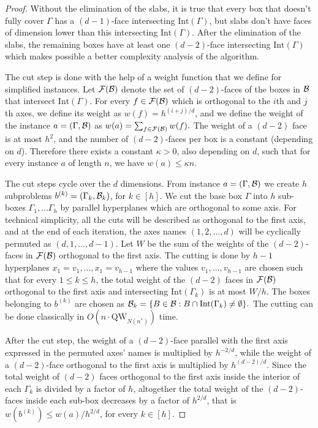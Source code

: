 \documentclass[12pt]{article}
\newcommand{\qw}{\mathrm{QW}}
\newcommand{\Int}[1]{\mathrm{Int}(#1)}
\theoremstyle{definition}
\begin{document}
\begin{proof}
Without the elimination of the slabs, it is true that every box that doesn't fully cover $\Gamma$ has a $(d-1)$-face intersecting $\Int{\Gamma}$, but slabs don't have faces of dimension lower than this intersecting $\Int{\Gamma}$. 
After the elimination of the slabs, the remaining boxes have at least one $(d-2)$-face intersecting $\Int{\Gamma}$ which makes possible a better complexity analysis of the algorithm.

The cut step is done with the help of a weight function that we define for simplified instances.
Let ${\cal F(B)}$ denote the set of $(d-2)$-faces of the boxes in ${\cal B}$ that intersect $\Int{\Gamma}$.
For every $f \in {\cal F(B)}$ which is orthogonal to the $i$th and $j$th axes, we define its weight as $w(f) = h^{(i+j)/d}$, and we define the weight of the instance  $a = (\Gamma, {\cal B})$ as $w(a) =  \sum_{f \in {\cal F(B)}} w(f).$ 
The weight of a $(d-2)$ face is at most $h^2$, and the number of $(d-2)$-faces per box is a constant (depending on $d$). Therefore there exists a constant $\kappa >0$, also depending on $d$, such that for every instance $a$ of length $n$, we have $w(a) \leq \kappa n$.


The cut steps cycle over the $d$ dimensions.
From instance $a = (\Gamma, {\cal B})$ we create $h$ subproblems $b^{(k)} = (\Gamma_k , {\cal B}_k)$, for $k \in [h].$
We cut the base box $\Gamma$ into $h$ sub-boxes $\Gamma_1, \ldots  \Gamma_h$ by parallel hyperplanes which are orthogonal to some axis. 
For technical simplicity, all the cuts will be described as orthogonal to the first axis, and at the end of each iteration, the axes names $(1,2, \ldots, d)$ will be cyclically permuted as $(d, 1, \ldots , d-1)$.  Let $W$ be the sum of the weights of the $(d-2)$-faces in ${\cal F(B)}$ orthogonal to the first axis.
The cutting is done by $h-1$ hyperplanes $x_1 = v_1, \ldots , x_1 = v_{h-1}$ where the values $v_1, \ldots , v_{h-1}$ are chosen such that for every $1 \leq k \leq h$,  the total weight of the $(d-2)$ faces in ${\cal F(B)}$ orthogonal to the first axis and intersecting  $\Int{\Gamma_{k}}$ is at most $W/h$. 
The boxes belonging to $b^{(k)}$ are chosen as ${\cal B}_k = \{ B \in {\cal B} : B \cap \Int{\Gamma_{k}} \neq \emptyset \}.$ 
The cutting can be done classically in $O(n \cdot \qw_{N(n^*)})$ time.

After the cut step, the weight of a $(d-2)$-face parallel with the first axis expressed in the permuted axes' names
is multiplied by $h^{-2/d}$, while the weight of a $(d-2)$-face orthogonal to the first axis is multiplied by $h^{(d-2)/d}$.
Since the total weight of $(d-2)$ faces orthogonal to the first axis inside the interior of each $\Gamma_k$ is divided by a factor of $h$, altogether the total weight of the $(d-2)$-faces inside each sub-box decreases by a factor of $h^{2/d}$, that is $w(b^{(k)}) \leq w(a)/h^{2/d}$, for every $k \in [h]$.  


\end{proof}
\end{document}
